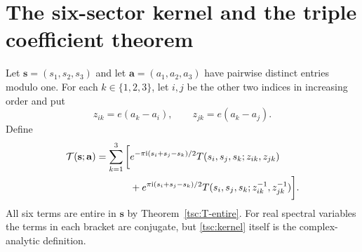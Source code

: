 \documentclass[11pt]{article}
\numberwithin{equation}{section}
\theoremstyle{definition}\newtheorem{definition}[theorem]{Definition}
\theoremstyle{remark}\newtheorem{remark}[theorem]{Remark}
\newcommand{\ii}{\mathrm i}
\newcommand{\calT}{\mathcal T}
\begin{document}
\section{The six-sector kernel and the triple coefficient theorem}\label{tsc:triple}
Let $\mathbf s=(s_1,s_2,s_3)$ and let $\mathbf a=(a_1,a_2,a_3)$ have
pairwise distinct entries modulo one. For each $k\in\{1,2,3\}$, let $i,j$
be the other two indices in increasing order and put
\begin{equation}\label{tsc:colors}
 z_{ik}=e(a_k-a_i),\qquad z_{jk}=e(a_k-a_j).
\end{equation}
Define
\begin{align}\label{tsc:kernel}
 \calT(\mathbf s;\mathbf a)=\sum_{k=1}^3\bigg[&
  e^{-\pi\ii(s_i+s_j-s_k)/2}
       T(s_i,s_j,s_k;z_{ik},z_{jk})\notag\\
 &+e^{\pi\ii(s_i+s_j-s_k)/2}
       T(s_i,s_j,s_k;z_{ik}^{-1},z_{jk}^{-1})\bigg].
\end{align}
All six terms are entire in $\mathbf s$ by Theorem~\ref{tsc:T-entire}.
For real spectral variables the terms in each bracket are conjugate, but
\eqref{tsc:kernel} itself is the complex-analytic definition.
\end{document}
